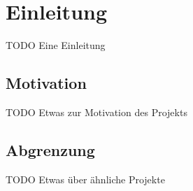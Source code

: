 \chapter{Einleitung}
TODO Eine Einleitung

\section{Motivation}
TODO Etwas zur Motivation des Projekts

\section{Abgrenzung}
TODO Etwas über ähnliche Projekte 